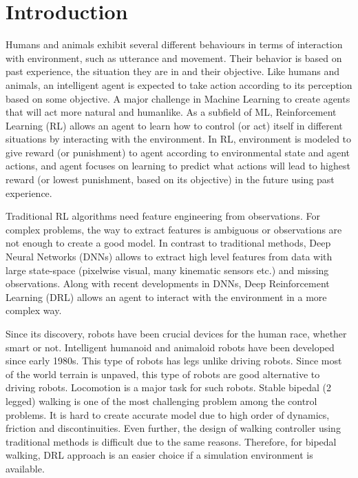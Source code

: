 \documentclass[a4paper, 12pt]{article} %
\begin{document}
\section{Introduction} \label{sec:first_intro}

Humans and animals exhibit several different behaviours in terms of 
interaction with environment, such as utterance and movement. 
Their behavior is based on past experience, the situation they are in  and their objective. 
Like humans and animals, an intelligent agent is expected to take 
action according to its perception based on some objective. 
A major challenge in Machine Learning to create agents that will 
act more natural and humanlike. 
As a subfield of ML, Reinforcement Learning (RL) allows an 
agent to learn how to control (or act) itself in different situations by interacting with the environment. In RL, environment is modeled to give reward (or punishment) to agent 
according to environmental state and agent actions, and agent focuses
on learning to predict what actions will lead to highest reward 
(or lowest punishment, based on its objective) in the future using past experience. 

Traditional RL algorithms need feature engineering from observations. 
For complex problems, the way to extract features is ambiguous or 
observations are not enough to create a good model. 
In contrast to traditional methods, Deep Neural Networks (DNNs) allows to extract 
high level features from data with large state-space 
(pixelwise visual, many kinematic sensors etc.) and missing  observations.
Along with recent developments in DNNs, Deep Reinforcement Learning (DRL)
allows an agent to interact with the environment in a more complex way.

Since its discovery, robots have been crucial devices for the human race, whether smart or not. 
Intelligent humanoid and animaloid robots have been developed since early 1980s. 
This type of robots has legs unlike driving robots. 
Since most of the world terrain is unpaved, this type of robots are good alternative to driving robots. 
Locomotion is a major task for such robots. Stable bipedal (2 legged)  walking 
is one of the most challenging problem among the control problems. 
It is hard to create accurate model due to high order of dynamics,  friction and discontinuities. 
Even further, the design of walking controller using traditional methods is difficult due to the same reasons. 
Therefore, for bipedal walking, DRL approach is an easier choice if a simulation environment is available. 
\end{document}

